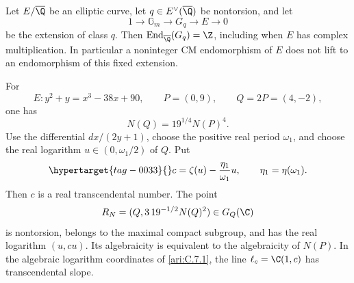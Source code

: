 \begin{proposition}\hypertarget{tag-001I}{}\label{ari:C.7.9}

Let $E/\overline\Q$ be an elliptic curve, let
$q\in E^\vee(\overline\Q)$ be nontorsion, and let
\[
 1\longrightarrow\mathbb G_m\longrightarrow G_q
       \longrightarrow E\longrightarrow0
\]
be the extension of class $q$. Then
$\operatorname{End}_{\overline\Q}(G_q)=\Z$, including when
$E$ has complex multiplication. In particular a noninteger
CM endomorphism of $E$ does not lift to an endomorphism of this
fixed extension.

For
\[
 E:y^2+y=x^3-38x+90,\qquad P=(0,9),\qquad Q=2P=(4,-2),
\]
one has
\[
 N(Q)=19^{1/4}N(P)^4.
\]
Use the differential $dx/(2y+1)$, choose the positive real
period $\omega_1$, and choose the real logarithm
$u\in(0,\omega_1/2)$ of $Q$. Put
\begin{equation}\hypertarget{tag-0033}{}\label{ari:eq:cd-slope}
 c=\zeta(u)-\frac{\eta_1}{\omega_1}u,
 \qquad \eta_1=\eta(\omega_1).
\end{equation}
Then $c$ is a real transcendental number. The point
\[
 R_N=(Q,3\,19^{-1/2}N(Q)^2)\in G_Q(\C)
\]
is nontorsion, belongs to the maximal compact subgroup, and has
the real logarithm $(u,cu)$. Its algebraicity is equivalent to
the algebraicity of $N(P)$. In the algebraic logarithm coordinates
of \ref{ari:C.7.1}, the line $\ell_c=\C(1,c)$ has transcendental
slope.
\end{proposition}


